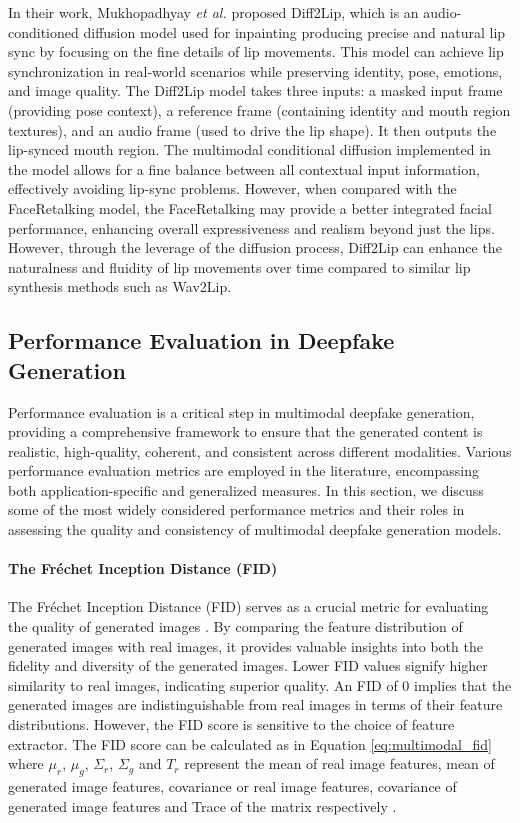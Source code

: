 In their work, Mukhopadhyay \textit{et al.} \cite{mukhopadhyay2024diff2lip} proposed Diff2Lip, which is an audio-conditioned diffusion model used for inpainting producing precise and natural lip sync by focusing on the fine details of lip movements. This model can achieve lip synchronization in real-world scenarios while preserving identity, pose, emotions, and image quality. The Diff2Lip model takes three inputs: a masked input frame (providing pose context), a reference frame (containing identity and mouth region textures), and an audio frame (used to drive the lip shape). It then outputs the lip-synced mouth region. The multimodal conditional diffusion implemented in the model allows for a fine balance between all contextual input information, effectively avoiding lip-sync problems. However, when compared with the FaceRetalking model, the FaceRetalking may provide a better integrated facial performance, enhancing overall expressiveness and realism beyond just the lips. However, through the leverage of the diffusion process, Diff2Lip can enhance the naturalness and fluidity of lip movements over time compared to similar lip synthesis methods such as Wav2Lip.


\subsection{Performance Evaluation in Deepfake Generation}
\label{subsec:multimodal_lossfunc}


Performance evaluation is a critical step in multimodal deepfake generation, providing a comprehensive framework to ensure that the generated content is realistic, high-quality, coherent, and consistent across different modalities. Various performance evaluation metrics are employed in the literature, encompassing both application-specific and generalized measures. In this section, we discuss some of the most widely considered performance metrics and their roles in assessing the quality and consistency of multimodal deepfake generation models.

\paragraph{The Fréchet Inception Distance (FID)}

The Fréchet Inception Distance (FID) serves as a crucial metric for evaluating the quality of generated images \cite{nunn2021compound, singh2020using, yu2021artificial}. By comparing the feature distribution of generated images with real images, it provides valuable insights into both the fidelity and diversity of the generated images. Lower FID values signify higher similarity to real images, indicating superior quality. An FID of 0 implies that the generated images are indistinguishable from real images in terms of their feature distributions. However, the FID score is sensitive to the choice of feature extractor. The FID score can be calculated as in Equation \ref{eq:multimodal_fid} where $\mu_r$, $\mu_g$, $\Sigma_r$, $\Sigma_g$ and $T_r$ represent the mean of real image features, mean of generated image features, covariance or real image features, covariance of generated image features and Trace of the matrix respectively \cite{nunn2021compound}. 

